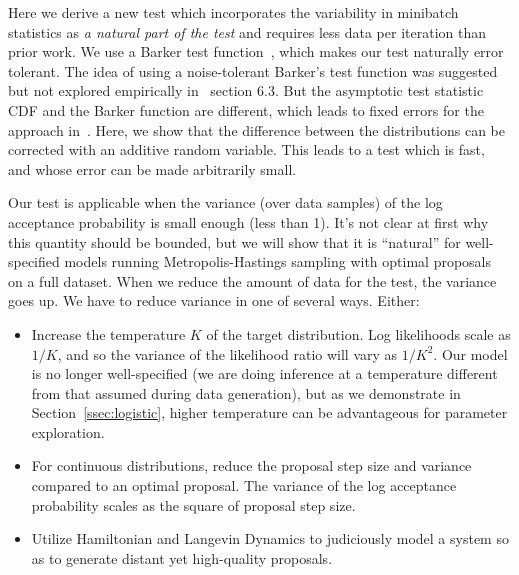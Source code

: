 \documentclass[letterpaper]{article}
\begin{document}
Here we derive a new test which incorporates the variability in minibatch
statistics as {\em a natural part of the test} and requires less data per
iteration than prior work. We use a Barker test function~\citep{Barker65}, which
makes our test naturally error tolerant. The idea of using a noise-tolerant
Barker's test function was suggested but not explored empirically
in~\citep{TallData16} section 6.3. But the asymptotic test statistic CDF and the
Barker function are different, which leads to fixed errors for the approach
in~\citep{TallData16}. Here, we show that the difference between the
distributions can be corrected with an additive random variable. This leads to a
test which is fast, and whose error can be made arbitrarily small.

Our test is applicable when the variance (over data samples) of the log
acceptance probability is small enough (less than 1). It's not clear at first why
this quantity should be bounded, but we will show that it is ``natural'' for
well-specified models running Metropolis-Hastings sampling with optimal
proposals~\citep{OptimalScaling01} on a full dataset. When we reduce the amount
of data for the test, the variance goes up. We have to reduce variance in one
of several ways. Either:

\begin{itemize}[noitemsep]
    \item Increase the temperature $K$ of the target distribution. Log
    likelihoods scale as $1/K$, and so the variance of the likelihood ratio will
    vary as $1/K^2$. Our model is no longer well-specified (we are doing
    inference at a temperature different from that assumed during data
    generation), but as we demonstrate in Section~\ref{ssec:logistic}, higher
    temperature can be advantageous for parameter exploration.

    \item For continuous distributions, reduce the proposal step size and
    variance compared to an optimal proposal. The variance of the log acceptance
    probability scales as the square of proposal step size. 

    \item Utilize Hamiltonian and Langevin Dynamics to judiciously model a system
    so as to generate distant yet high-quality proposals.
\end{itemize}
\end{document}

